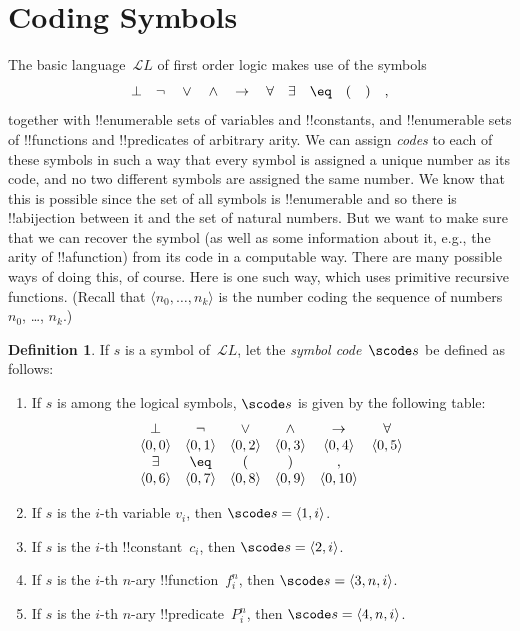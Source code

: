 \documentclass[10pt,a4paper]{article}
\theoremstyle{plain}
\theoremstyle{definition}
\newtheorem{defn}[thm]{Definition}
\theoremstyle{remark}
\newcommand*{\olfileid}[3]{}
\newcommand*{\olsection}[1]{\section*{#1}}
\providecommand{\lif}{\mathbin{\rightarrow}}
\providecommand{\lforall}{\mathord{\forall}}
\providecommand{\lexists}{\mathord{\exists}}
\providecommand{\lfalse}{\bot}
\providecommand{\Obj}{}
\providecommand{\Lang}{\ensuremath{\mathcal{L}}}
\providecommand{\tuple}[1]{\langle #1 \rangle}
\begin{document}



\olfileid{inc}{art}{cod}
\olsection{Coding Symbols}

The basic language~$\Lang L$ of first order logic makes use of the symbols
\[
\lfalse \quad \lnot \quad \lor \quad \land \quad \lif \quad \lforall
\quad \lexists \quad \eq \quad ( \quad ) \quad ,
\]
together with !!{enumerable} sets of variables and !!{constant}s, and
!!{enumerable} sets of !!{function}s and !!{predicate}s of arbitrary
arity.  We can assign \emph{codes} to each of these symbols in such a
way that every symbol is assigned a unique number as its code, and no
two different symbols are assigned the same number.  We know that this
is possible since the set of all symbols is !!{enumerable} and so
there is !!a{bijection} between it and the set of natural numbers.
But we want to make sure that we can recover the symbol (as well as
some information about it, e.g., the arity of !!a{function}) from its
code in a computable way.  There are many possible ways of doing this,
of course.  Here is one such way, which uses primitive recursive
functions.  (Recall that $\tuple{n_0, \dots, n_k}$ is the number
coding the sequence of numbers $n_0$, \dots, $n_k$.)

\begin{defn}
If $s$ is a symbol of~$\Lang L$, let the \emph{symbol code}~$\scode s$ be
defined as follows:
\begin{enumerate}
\item If $s$ is among the logical symbols, $\scode s$ is given by the
  following table:
\[
\begin{array}{cccccccccc}
  \lfalse & \lnot & \lor & \land & \lif & \lforall \\
\tuple{0, 0} & \tuple{0, 1} & \tuple{0, 2} & \tuple{0, 3} &
\tuple{0, 4} & \tuple{0, 5} \\
\lexists & \eq & ( & ) & ,\\
\tuple{0, 6} & \tuple{0, 7} &
\tuple{0, 8} & \tuple{0, 9} & \tuple{0, 10}
\end{array}
\]
\item If $s$ is the $i$-th variable $\Obj v_i$, then $\scode s = \tuple{1, i}$.
\item If $s$ is the $i$-th !!{constant}~$\Obj c_i$, then
  $\scode s = \tuple{2, i}$.
\item If $s$ is the $i$-th $n$-ary !!{function}~$\Obj f_i^n$, then
  $\scode s = \tuple{3, n, i}$.
\item If $s$ is the $i$-th $n$-ary !!{predicate}~$\Obj P_i^n$, then
  $\scode s = \tuple{4, n, i}$.
\end{enumerate}
\end{defn}
\end{document}
